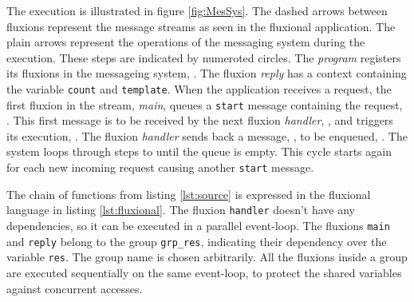 The execution is illustrated in figure \ref{fig:MesSys}.
The dashed arrows between fluxions represent the message streams as seen in the fluxional application.
The plain arrows represent the operations of the messaging system during the execution.
These steps are indicated by numeroted circles.
The \textit{program} registers its fluxions in the messageing system, .
The fluxion \textit{reply} has a context containing the variable \texttt{count} and \texttt{tem\-plate}.
When the application receives a request, the first fluxion in the stream, \textit{main}, queues a \texttt{start} message containing the request, .
This first message is to be received by the next fluxion \textit{handler}, , and triggers its execution, .
The fluxion \textit{handler} sends back a message, , to be enqueued, .
The system loops through steps  to  until the queue is empty.
This cycle starts again for each new incoming request causing another \texttt{start} message.

\begin{figure}[h!]%
\end{figure}

The chain of functions from listing \ref{lst:source} is expressed in the fluxional language in listing \ref{lst:fluxional}.
The fluxion \texttt{handler} doesn't have any dependencies, so it can be executed in a parallel event-loop.
The fluxions \texttt{main} and \texttt{reply} belong to the group \texttt{grp\_res}, indicating their dependency over the variable \texttt{res}.
The group name is chosen arbitrarily.
All the fluxions inside a group are executed sequentially on the same event-loop, to protect the shared variables against concurrent accesses.

